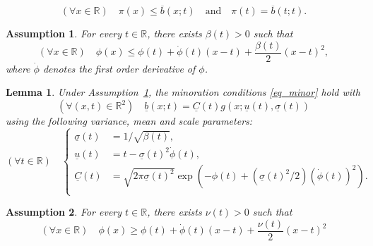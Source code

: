 \documentclass[10pt,a4paper]{amsart}
\newtheorem{assumption}{Assumption}
\newtheorem{lemma}{Lemma}
\newcommand{\bR}{\mathbb{R}}
\begin{document}
\begin{equation}
(\forall x \in \bR) \quad \pi(x) \leq \overline{b}(x;t) \quad \text{and} \quad \pi(t) = \overline{b}(t;t).
\label{eq_major}
\end{equation}

\begin{assumption}
\label{assump1}
For every $t \in \mathbb{R}$, there exists $\beta(t) > 0$ such that 
\begin{equation}
(\forall x \in \mathbb{R}) \quad \phi(x) \leq \phi(t) + \dot{\phi}(t) (x-t) + \frac{\beta(t)}{2} (x-t)^2,
\end{equation}
where $\dot{\phi}$ denotes the first order derivative of $\phi$. 
\end{assumption}

\begin{lemma}
\label{lem:ass1}
Under Assumption~\ref{assump1}, the minoration conditions \eqref{eq_minor} hold with
\begin{equation}
(\forall (x,t) \in \bR^2) \quad \underline{b}(x;t) = 
\underline{C}(t) g(x; \underline{u}(t), \underline{\sigma}(t))
\end{equation}
using the following variance, mean and scale parameters:
\begin{equation}
(\forall t \in \bR) \quad
\begin{cases}
\underline{\sigma}(t) & = 1/\sqrt{\beta(t)}, \\
\underline{u}(t) & = t -\underline{\sigma}(t)^2 \dot{\phi}(t), \\
\underline{C}(t) & = \sqrt{2 \pi \underline{\sigma}(t)^2} \exp\left(- \phi(t) + (\underline{\sigma}(t)^2/2) (\dot{\phi}(t))^2\right). \\
\end{cases}
\end{equation}
\end{lemma}

\begin{assumption}
\label{assump2}
For every $t \in \mathbb{R}$, there exists $\nu(t)>0$ such that
\begin{equation}
(\forall x \in \mathbb{R}) \quad \phi(x) \geq \phi(t) + \dot{\phi}(t) (x-t) + \frac{\nu(t)}{2} (x-t)^2
\end{equation}
\end{assumption}
\end{document}
